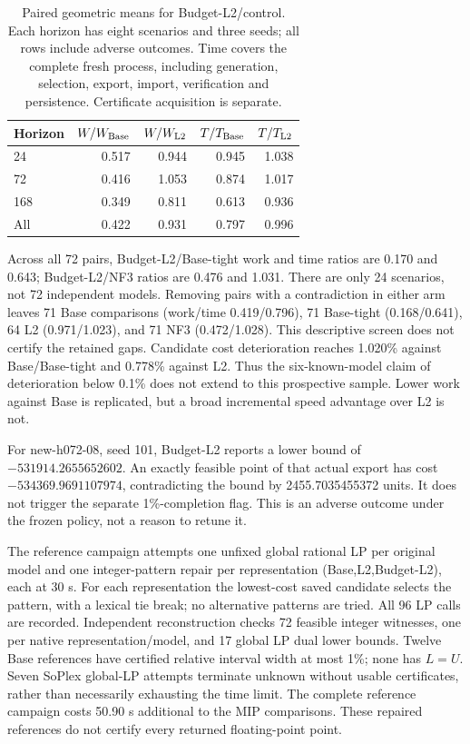 \begin{table}[htbp]
\centering\small
\caption{Paired geometric means for Budget-L2/control. Each horizon has eight
scenarios and three seeds; all rows include adverse outcomes. Time covers the
complete fresh process, including generation, selection, export, import,
verification and persistence. Certificate acquisition is separate.}
\label{tab:orf-prospective-performance}
\begin{tabular}{lrrrr}\toprule
Horizon & $W/ W_{\rm Base}$ & $W/W_{\rm L2}$ & $T/T_{\rm Base}$ & $T/T_{\rm L2}$\\\midrule
24 & 0.517 & 0.944 & 0.945 & 1.038\\
72 & 0.416 & 1.053 & 0.874 & 1.017\\
168 & 0.349 & 0.811 & 0.613 & 0.936\\
All & 0.422 & 0.931 & 0.797 & 0.996\\
\bottomrule\end{tabular}\end{table}
Across all 72 pairs, Budget-L2/Base-tight work and time ratios are 0.170 and
0.643; Budget-L2/NF3 ratios are 0.476 and 1.031. There are only 24 scenarios,
not 72 independent models. Removing pairs with a contradiction in either arm
leaves 71 Base comparisons (work/time 0.419/0.796), 71 Base-tight
(0.168/0.641), 64 L2 (0.971/1.023), and 71 NF3 (0.472/1.028).
This descriptive screen does not certify the retained gaps. Candidate cost
deterioration reaches 1.020\% against Base/Base-tight and 0.778\% against L2.
Thus the six-known-model claim of deterioration below 0.1\% does not extend to
this prospective sample. Lower work against Base is replicated, but a broad
incremental speed advantage over L2 is not.

For new-h072-08, seed 101, Budget-L2 reports a lower bound of
$-531914.2655652602$. An exactly feasible point of that actual export has cost
$-534369.9691107974$, contradicting the bound by 2455.7035455372 units.
It does not trigger the separate 1\%-completion flag. This is an adverse outcome
under the frozen policy, not a reason to retune it.

The reference campaign attempts one unfixed global rational LP per original
model and one integer-pattern repair per representation (Base,L2,Budget-L2),
each at 30 s. For each representation the lowest-cost saved candidate selects
the pattern, with a lexical tie break; no alternative patterns are tried.
All 96 LP calls are recorded. Independent reconstruction checks 72 feasible
integer witnesses, one per native representation/model, and 17 global LP dual
lower bounds. Twelve Base references have certified relative interval width
at most 1\%; none has $L=U$. Seven SoPlex global-LP attempts terminate unknown
without usable certificates, rather than necessarily exhausting the time limit.
The complete reference campaign costs 50.90 s additional to the MIP comparisons.
These repaired references do not certify every returned floating-point point.

